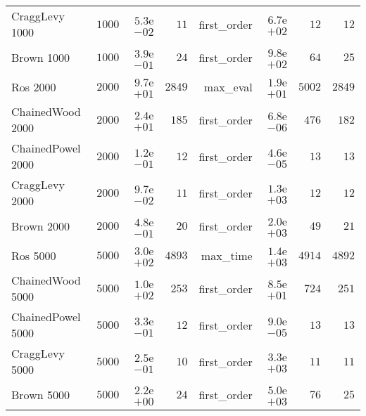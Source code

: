 \begin{longtable}[c]{lrrrrrrr}
CraggLevy 1000 & \( 1000\) & \( 5.3\)e\(-02\) & \(   11\) & first\_order & \( 6.7\)e\(+02\) & \(   12\) & \(   12\) \\
Brown 1000 & \( 1000\) & \( 3.9\)e\(-01\) & \(   24\) & first\_order & \( 9.8\)e\(+02\) & \(   64\) & \(   25\) \\
Ros 2000 & \( 2000\) & \( 9.7\)e\(+01\) & \( 2849\) & max\_eval & \( 1.9\)e\(+01\) & \( 5002\) & \( 2849\) \\
ChainedWood 2000 & \( 2000\) & \( 2.4\)e\(+01\) & \(  185\) & first\_order & \( 6.8\)e\(-06\) & \(  476\) & \(  182\) \\
ChainedPowel 2000 & \( 2000\) & \( 1.2\)e\(-01\) & \(   12\) & first\_order & \( 4.6\)e\(-05\) & \(   13\) & \(   13\) \\
CraggLevy 2000 & \( 2000\) & \( 9.7\)e\(-02\) & \(   11\) & first\_order & \( 1.3\)e\(+03\) & \(   12\) & \(   12\) \\
Brown 2000 & \( 2000\) & \( 4.8\)e\(-01\) & \(   20\) & first\_order & \( 2.0\)e\(+03\) & \(   49\) & \(   21\) \\
Ros 5000 & \( 5000\) & \( 3.0\)e\(+02\) & \( 4893\) & max\_time & \( 1.4\)e\(+03\) & \( 4914\) & \( 4892\) \\
ChainedWood 5000 & \( 5000\) & \( 1.0\)e\(+02\) & \(  253\) & first\_order & \( 8.5\)e\(+01\) & \(  724\) & \(  251\) \\
ChainedPowel 5000 & \( 5000\) & \( 3.3\)e\(-01\) & \(   12\) & first\_order & \( 9.0\)e\(-05\) & \(   13\) & \(   13\) \\
CraggLevy 5000 & \( 5000\) & \( 2.5\)e\(-01\) & \(   10\) & first\_order & \( 3.3\)e\(+03\) & \(   11\) & \(   11\) \\
Brown 5000 & \( 5000\) & \( 2.2\)e\(+00\) & \(   24\) & first\_order & \( 5.0\)e\(+03\) & \(   76\) & \(   25\) \\
\hline 
\end{longtable}
